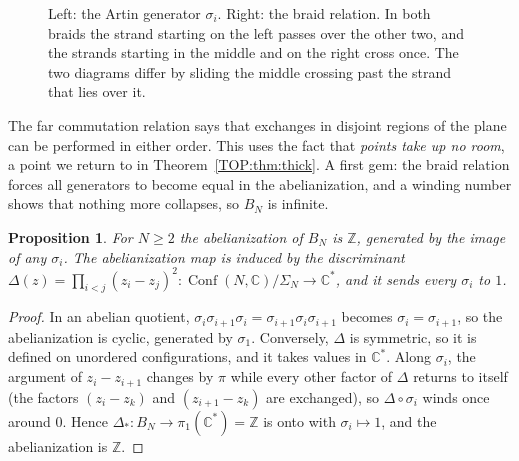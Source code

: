 \documentclass[11pt,openany]{book}
\theoremstyle{plain}
\newtheorem{proposition}[theorem]{Proposition}
\theoremstyle{definition}
\theoremstyle{remark}
\newcommand{\Z}{\mathbb{Z}}
\newcommand{\C}{\mathbb{C}}
\newcommand{\Conf}{\operatorname{Conf}}
\begin{document}
\begin{figure}[ht]
\caption{Left: the Artin generator $\sigma_i$. Right: the braid relation. In both braids the strand
starting on the left passes over the other two, and the strands starting in the middle and on the right
cross once. The two diagrams differ by sliding the middle crossing past the strand that lies over it.}
\label{TOP:fig:braid}
\end{figure}

The far commutation relation says that exchanges in disjoint regions of the plane can be performed in
either order. This uses the fact that \emph{points take up no room}, a point we return to in
Theorem~\ref{TOP:thm:thick}. A first gem: the braid relation forces all generators to become equal in
the abelianization, and a winding number shows that nothing more collapses, so $B_N$ is infinite.

\begin{proposition}\label{TOP:prop:abel}
For $N\ge2$ the abelianization of $B_N$ is $\Z$, generated by the image of any $\sigma_i$. The
abelianization map is induced by the discriminant
$\Delta(z)=\prod_{i<j}(z_i-z_j)^2\colon\Conf(N,\C)/\Sigma_N\to\C^*$, and it sends every $\sigma_i$ to $1$.
\end{proposition}

\begin{proof}
In an abelian quotient, $\sigma_i\sigma_{i+1}\sigma_i=\sigma_{i+1}\sigma_i\sigma_{i+1}$ becomes
$\sigma_i=\sigma_{i+1}$, so the abelianization is cyclic, generated by $\sigma_1$. Conversely,
$\Delta$ is symmetric, so it is defined on unordered configurations, and it takes values in $\C^*$. Along
$\sigma_i$, the argument of $z_i-z_{i+1}$ changes by $\pi$ while every other factor of $\Delta$ returns to
itself (the factors $(z_i-z_k)$ and $(z_{i+1}-z_k)$ are exchanged), so $\Delta\circ\sigma_i$ winds once around $0$.
Hence $\Delta_*\colon B_N\to\pi_1(\C^*)=\Z$ is onto with $\sigma_i\mapsto1$, and the abelianization is $\Z$.
\end{proof}
\end{document}
